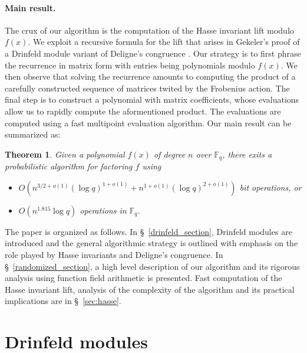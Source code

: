 \documentclass[12pt]{article}
\theoremstyle{plain}
\newtheorem{theorem}{Theorem}
\theoremstyle{definition}
\def\F{\ensuremath{\mathbb{F}}}
\begin{document}
\paragraph{Main result.}
The crux of our algorithm is the computation of the Hasse invariant lift modulo $f(x)$. We exploit 
a recursive formula for the lift that arises in Gekeler's proof of a Drinfeld module variant of 
Deligne's congruence \cite{gek}. Our strategy is to first phrase the recurrence in matrix form with 
entries being polynomials modulo $f(x)$. We then observe that solving the recurrence amounts to 
computing the product of a carefully constructed sequence of matrices twited by the Frobenius 
action. The final step is to construct a polynomial with matrix coefficients, whose evaluations 
allow us to rapidly compute the aformentioned product. The evaluations are computed using a fast 
multipoint evaluation algorithm. Our main result can be summarized as:

\begin{theorem}
	\label{theorem:main}
	Given a polynomial $f(x)$ of degree $n$ over $\F_q$, there exits a probabilistic algorithm for 
	factoring $f$ using
	\begin{itemize}
		\item $O(n^{3/2+o(1)} (\log q)^{1+o(1)} + n^{1+o(1)} (\log q)^{2+o(1)})$ bit operations, or
		\item $O(n^{1.815}\log q)$ operations in $\F_q$.
	\end{itemize}
\end{theorem}


The paper is organized as follows. In \S~\ref{drinfeld_section}, Drinfeld modules are introduced 
and the general algorithmic strategy is outlined with emphasis on the role played by Hasse 
invariants and Deligne's congruence. In \S~\ref{randomized_section}, a high level description of 
our algorithm and its rigorous analysis using function field arithmetic is presented. Fast 
computation of the Hasse invariant lift, analysis of the complexity of the algorithm and its 
practical implications are in \S~\ref{sec:hasse}. 
 
 
 
 

\section{Drinfeld modules}
\end{document}
